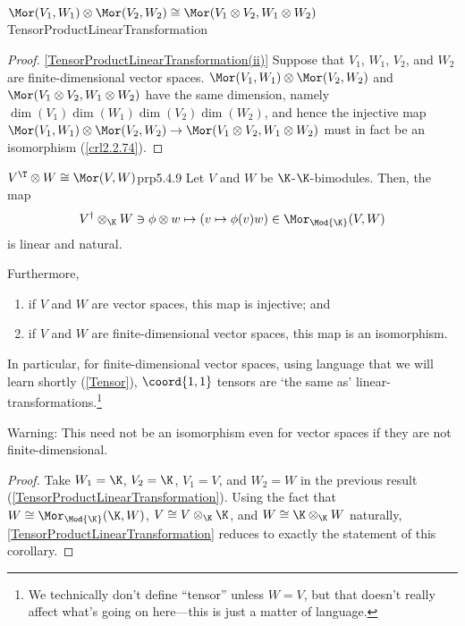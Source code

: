 \begin{thm}{$\Mor (V_1,W_1)\otimes \Mor (V_2,W_2)\cong \Mor (V_1\otimes V_2,W_1\otimes W_2)$}{TensorProductLinearTransformation}
\begin{proof}
		\blni
		\cref{TensorProductLinearTransformation(ii)} Suppose that $V_1$, $W_1$, $V_2$, and $W_2$ are finite-dimensional vector spaces.  $\Mor (V_1,W_1)\otimes \Mor (V_2,W_2)$ and $\Mor (V_1\otimes V_2,W_1\otimes W_2)$ have the same dimension, namely $\dim (V_1)\dim (W_1)\dim (V_2)\dim (W_2)$, and hence the injective map $\Mor (V_1,W_1)\otimes \Mor (V_2,W_2)\rightarrow \Mor (V_1\otimes V_2,W_1\otimes W_2)$ must in fact be an isomorphism (\cref{crl2.2.74}).
	\end{proof}
\end{thm}
\begin{crl}{$V^{\T}\otimes W\cong \Mor (V,W)$}{prp5.4.9}
	Let $V$ and $W$ be $\K$-$\K$-bimodules.  Then, the map
	\begin{equation*}
	V^{\dagger}\otimes _{\K}W\ni \phi \otimes w\mapsto (v\mapsto \phi (v)w)\in \Mor _{\Mod{\K}}(V,W)
	\end{equation*}
	is linear and natural.
	
	Furthermore,
	\begin{enumerate}
		\item if $V$ and $W$ are vector spaces, this map is injective; and
		\item if $V$ and $W$ are finite-dimensional vector spaces, this map is an isomorphism.
	\end{enumerate}
	\begin{rmk}
		In particular, for finite-dimensional vector spaces, using language that we will learn shortly (\cref{Tensor}), $\coord{1,1}$ tensors are `the same as' linear-transformations.\footnote{We technically don't define ``tensor'' unless $W=V$, but that doesn't really affect what's going on here---this is just a matter of language.}
	\end{rmk}
	\begin{rmk}
		Warning:  This need not be an isomorphism even for vector spaces if they are not finite-dimensional.
	\end{rmk}
	\begin{proof}
		Take $W_1=\K$, $V_2=\K$, $V_1=V$, and $W_2=W$ in the previous result (\cref{TensorProductLinearTransformation}).  Using the fact that $W\cong \Mor _{\Mod{\K}}(\K ,W)$, $V\cong V\otimes _{\K}\K$, and $W\cong \K \otimes _{\K}W$ naturally, \cref{TensorProductLinearTransformation} reduces to exactly the statement of this corollary.
	\end{proof}
\end{crl}
